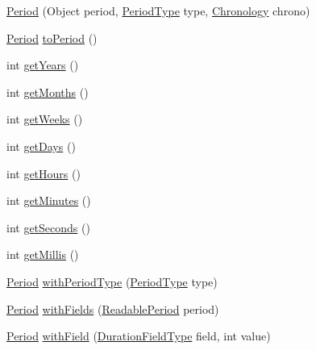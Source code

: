 \begin{DoxyCompactItemize}
\item 
\hyperlink{classorg_1_1joda_1_1time_1_1_period_aea5969588f463515c224a8f51f4d1651}{Period} (Object period, \hyperlink{classorg_1_1joda_1_1time_1_1_period_type}{Period\-Type} type, \hyperlink{classorg_1_1joda_1_1time_1_1_chronology}{Chronology} chrono)
\item 
\hyperlink{classorg_1_1joda_1_1time_1_1_period}{Period} \hyperlink{classorg_1_1joda_1_1time_1_1_period_a704610ed148eca03ec1c687cdd5ca544}{to\-Period} ()
\item 
int \hyperlink{classorg_1_1joda_1_1time_1_1_period_a7a25a770a775354766e726147c7626bc}{get\-Years} ()
\item 
int \hyperlink{classorg_1_1joda_1_1time_1_1_period_ad38fc2ad003556d3b93705b465d137ae}{get\-Months} ()
\item 
int \hyperlink{classorg_1_1joda_1_1time_1_1_period_a36a2b2f31a4c7195a371d90615423ddc}{get\-Weeks} ()
\item 
int \hyperlink{classorg_1_1joda_1_1time_1_1_period_a37777a87f5bb2f0fd54f6cc34afbd902}{get\-Days} ()
\item 
int \hyperlink{classorg_1_1joda_1_1time_1_1_period_a7870659c3680298239af9c34eed569da}{get\-Hours} ()
\item 
int \hyperlink{classorg_1_1joda_1_1time_1_1_period_a7edc7af16b9eeaecdeaeebeb08bf75fa}{get\-Minutes} ()
\item 
int \hyperlink{classorg_1_1joda_1_1time_1_1_period_aa3226252c7b8a5624e6f90fa99f1a045}{get\-Seconds} ()
\item 
int \hyperlink{classorg_1_1joda_1_1time_1_1_period_a21f04bc80d480a4ef0b45b130cce44da}{get\-Millis} ()
\item 
\hyperlink{classorg_1_1joda_1_1time_1_1_period}{Period} \hyperlink{classorg_1_1joda_1_1time_1_1_period_af36acf57d68d126c18bd28f5dbb1f2b3}{with\-Period\-Type} (\hyperlink{classorg_1_1joda_1_1time_1_1_period_type}{Period\-Type} type)
\item 
\hyperlink{classorg_1_1joda_1_1time_1_1_period}{Period} \hyperlink{classorg_1_1joda_1_1time_1_1_period_a93bea1a868c8c22bef47ce7740ed8cd9}{with\-Fields} (\hyperlink{interfaceorg_1_1joda_1_1time_1_1_readable_period}{Readable\-Period} period)
\item 
\hyperlink{classorg_1_1joda_1_1time_1_1_period}{Period} \hyperlink{classorg_1_1joda_1_1time_1_1_period_abb2809c4d3a855eeca8f8802ca3d71dc}{with\-Field} (\hyperlink{classorg_1_1joda_1_1time_1_1_duration_field_type}{Duration\-Field\-Type} field, int value)
\item 

\end{DoxyCompactItemize}
